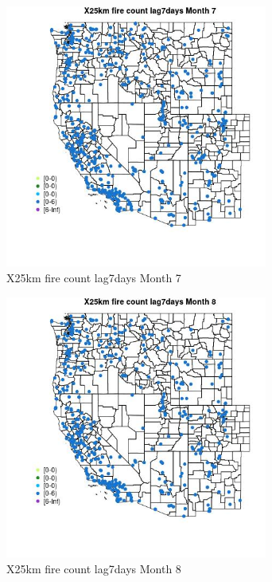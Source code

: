\begin{figure} 
\centering  
\includegraphics[width=0.77\textwidth]{Code_Outputs/Report_ML_input_PM25_Step4_part_e_de_duplicated_aves_compiled_2019-05-14wNAs_MapObsMo7X25km_fire_count_lag7days.jpg} 
\caption{\label{fig:Report_ML_input_PM25_Step4_part_e_de_duplicated_aves_compiled_2019-05-14wNAsMapObsMo7X25km_fire_count_lag7days}X25km fire count lag7days Month 7} 
\end{figure} 
 

\begin{figure} 
\centering  
\includegraphics[width=0.77\textwidth]{Code_Outputs/Report_ML_input_PM25_Step4_part_e_de_duplicated_aves_compiled_2019-05-14wNAs_MapObsMo8X25km_fire_count_lag7days.jpg} 
\caption{\label{fig:Report_ML_input_PM25_Step4_part_e_de_duplicated_aves_compiled_2019-05-14wNAsMapObsMo8X25km_fire_count_lag7days}X25km fire count lag7days Month 8} 
\end{figure} 
 

